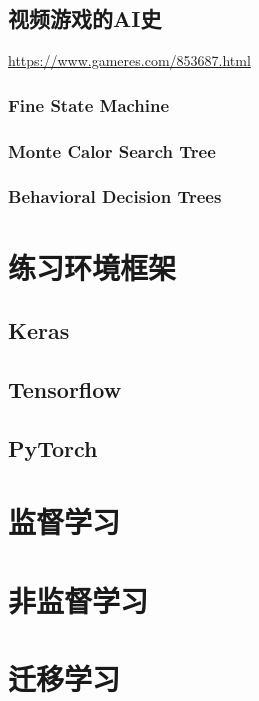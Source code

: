 \documentclass[UTF8,a4paper,12pt]{ctexbook}
\begin{document}
	
	\section{视频游戏的AI史}
		\url{https://www.gameres.com/853687.html}
		
		\subsection{Fine State Machine}
		
		\subsection{Monte Calor Search Tree}
		
		\subsection{Behavioral Decision Trees}
		

\chapter{练习环境框架}

	\section{Keras}

	\section{Tensorflow}
	
	\section{PyTorch}
		
		
		
\chapter{监督学习}



\chapter{非监督学习}


\chapter{迁移学习}
\end{document}
